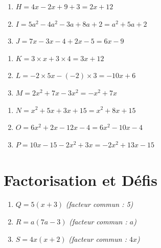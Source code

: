 \documentclass[a4paper]{book}
\begin{document}
    \begin{exercice}
    \begin{enumerate}
        \item $H = 4x - 2x + 9 + 3 = 2x + 12$
        \item $I = 5a^2 - 4a^2 - 3a + 8a + 2 = a^2 + 5a + 2$
        \item $J = 7x - 3x - 4 + 2x - 5 = 6x - 9$
    \end{enumerate}
    \end{exercice}
    
    \begin{exercice}
    \begin{enumerate}
        \item $K = 3 \times x + 3 \times 4 = 3x + 12$
        \item $L = -2 \times 5x - (-2) \times 3 = -10x + 6$
        \item $M = 2x^2 + 7x - 3x^2 = -x^2 + 7x$
    \end{enumerate}
    \end{exercice}
    
    \begin{exercice}
    \begin{enumerate}
        \item $N = x^2 + 5x + 3x + 15 = x^2 + 8x + 15$
        \item $O = 6x^2 + 2x - 12x - 4 = 6x^2 - 10x - 4$
        \item $P = 10x - 15 - 2x^2 + 3x = -2x^2 + 13x - 15$
    \end{enumerate}
    \end{exercice}
    
    \section{Factorisation et Défis}
    
    \begin{exercice}
    \begin{enumerate}
        \item $Q = 5(x + 3)$ \textit{(facteur commun : 5)}
        \item $R = a(7a - 3)$ \textit{(facteur commun : $a$)}
        \item $S = 4x(x + 2)$ \textit{(facteur commun : $4x$)}
    \end{enumerate}
    \end{exercice}
    
\end{document}
